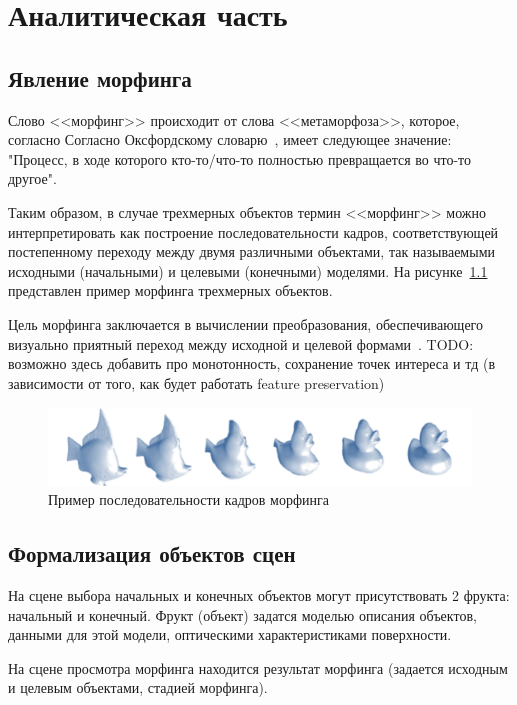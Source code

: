 \chapter{Аналитическая часть}

\section{Явление морфинга}
    Слово <<морфинг>> происходит от слова <<метаморфоза>>, которое, согласно 
    Согласно Оксфордскому словарю~\cite{oxford_dictionary}, имеет следующее значение: "Процесс, в ходе которого кто-то/что-то полностью превращается во что-то другое".

    Таким образом, в случае трехмерных объектов термин <<морфинг>> можно интерпретировать как построение последовательности кадров, соответствующей постепенному переходу между двумя различными
    объектами, так называемыми исходными (начальными) и целевыми (конечными) моделями. На рисунке~\ref{fig:morhping_example} представлен пример морфинга трехмерных объектов.
    
     Цель морфинга заключается в вычислении преобразования, обеспечивающего визуально приятный переход между исходной и целевой формами~\cite{mocanu}. TODO: возможно здесь добавить про монотонность, сохранение точек интереса и тд (в зависимости от того, как будет работать feature preservation)
    
    \begin{figure}[H]
		\centering
    	\includegraphics[width=\textwidth]{../inc/images/morhping_sequence}
    	\caption{Пример последовательности кадров морфинга}
    	\label{fig:morhping_example}  
    \end{figure}

\section{Формализация объектов сцен}

На сцене выбора начальных и конечных объектов могут присутствовать 2 фрукта: начальный и конечный. Фрукт (объект) задатся моделью описания объектов, данными для этой модели, оптическими характеристиками поверхности.

На сцене просмотра морфинга находится результат морфинга (задается исходным и целевым объектами, стадией морфинга). 

